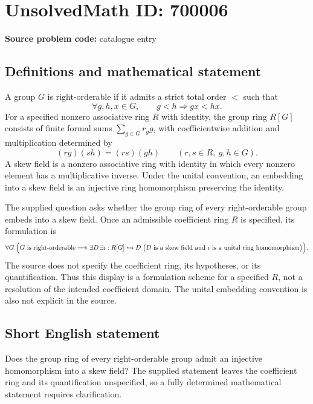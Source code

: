 \documentclass[11pt]{article}
\begin{document}
\section*{UnsolvedMath ID: 700006}
\textbf{Source problem code:} catalogue entry
\subsection{Definitions and mathematical statement}
A group \(G\) is right-orderable if it admits a strict total order \(<\) such that
\[
\forall g,h,x\in G,\qquad g<h\Longrightarrow gx<hx.
\]
For a specified nonzero associative ring \(R\) with identity, the group ring \(R[G]\) consists of finite formal sums \(\sum_{g\in G}r_g g\), with coefficientwise addition and multiplication determined by
\[
(rg)(sh)=(rs)(gh)\qquad(r,s\in R,\ g,h\in G).
\]
A skew field is a nonzero associative ring with identity in which every nonzero element has a multiplicative inverse. Under the unital convention, an embedding into a skew field is an injective ring homomorphism preserving the identity.

The supplied question asks whether the group ring of every right-orderable group embeds into a skew field. Once an admissible coefficient ring \(R\) is specified, its formulation is
\[
\forall G\;\Bigl(G\text{ is right-orderable}\Longrightarrow
\exists D\,\exists\iota:R[G]\hookrightarrow D\;
\bigl(D\text{ is a skew field and }\iota\text{ is a unital ring homomorphism}\bigr)\Bigr).
\]
The source does not specify the coefficient ring, its hypotheses, or its quantification. Thus this display is a formulation scheme for a specified \(R\), not a resolution of the intended coefficient domain. The unital embedding convention is also not explicit in the source.
\subsection{Short English statement}
Does the group ring of every right-orderable group admit an injective homomorphism into a skew field? The supplied statement leaves the coefficient ring and its quantification unspecified, so a fully determined mathematical statement requires clarification.
\end{document}
